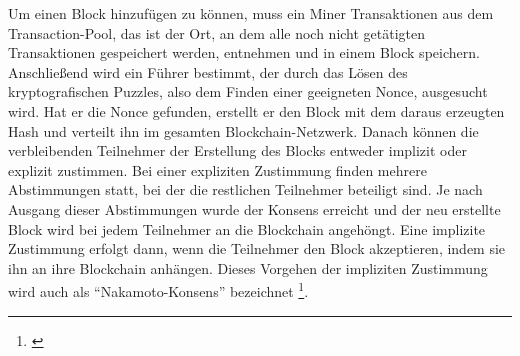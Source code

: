 Um einen Block hinzufügen zu können, muss ein Miner Transaktionen aus dem Transaction-Pool, das ist der Ort, an dem alle noch nicht getätigten Transaktionen gespeichert werden, entnehmen und in einem Block speichern. Anschließend wird ein Führer bestimmt, der durch das Lösen des kryptografischen Puzzles, also dem Finden einer geeigneten Nonce, ausgesucht wird. Hat er die Nonce gefunden, erstellt er den Block mit dem daraus erzeugten Hash und verteilt ihn im gesamten Blockchain-Netzwerk. Danach können die verbleibenden Teilnehmer der Erstellung des Blocks entweder implizit oder explizit zustimmen. Bei einer expliziten Zustimmung finden mehrere Abstimmungen statt, bei der die restlichen Teilnehmer beteiligt sind. Je nach Ausgang dieser Abstimmungen wurde der Konsens erreicht und der neu erstellte Block wird bei jedem Teilnehmer an die Blockchain angehöngt. Eine implizite Zustimmung erfolgt dann, wenn die Teilnehmer den Block akzeptieren, indem sie ihn an ihre Blockchain anhängen. Dieses Vorgehen der impliziten Zustimmung wird auch als ``Nakamoto-Konsens'' bezeichnet \footnote{\parencite[vgl.][S. 5f]{Raikwar.2019}}.

